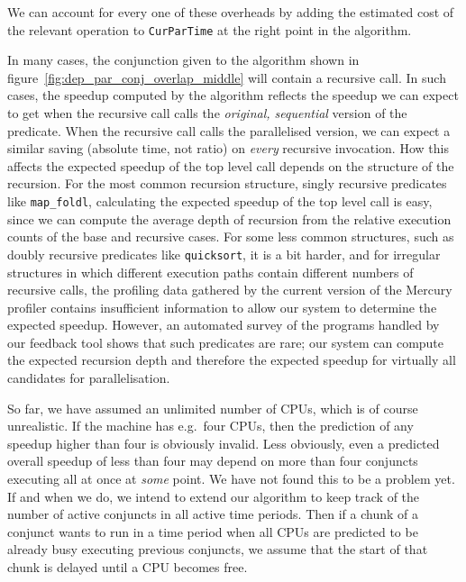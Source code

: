 \noindent
We can account for every one of these overheads
by adding the estimated cost of the relevant operation to \verb|CurParTime|
at the right point in the algorithm.

In many cases,
the conjunction given to the algorithm shown in figure~\ref{fig:dep_par_conj_overlap_middle}
will contain a recursive call.
In such cases, the speedup computed by the algorithm
reflects the speedup we can expect to get when the recursive call
calls the \emph{original, sequential} version of the predicate.
When the recursive call calls the parallelised version,
we can expect a similar saving (absolute time, not ratio)
on \emph{every} recursive invocation.
How this affects the expected speedup of the top level call
depends on the structure of the recursion.
For the most common recursion structure,
singly recursive predicates like \verb|map_foldl|,
calculating the expected speedup of the top level call is easy,
since we can compute the average depth of recursion
from the relative execution counts of the base and recursive cases.
For some less common structures,
such as doubly recursive predicates like \verb|quicksort|, it is a bit harder,
and for irregular structures in which different execution paths
contain different numbers of recursive calls,
the profiling data gathered by the current version of the Mercury profiler
contains insufficient information to allow our system to determine the
expected speedup.
However, an automated survey of the programs handled by our feedback tool
shows that such predicates are rare;
our system can compute
the expected recursion depth and therefore the expected speedup
for virtually all candidates for parallelisation.

So far, we have assumed an unlimited number of CPUs,
which is of course unrealistic.
If the machine has e.g.\ four CPUs,
then the prediction of any speedup higher than four is obviously invalid.
Less obviously,
even a predicted overall speedup of less than four may depend
on more than four conjuncts executing all at once at \emph{some} point.
We have not found this to be a problem yet.
If and when we do,
we intend to extend our algorithm to keep track
of the number of active conjuncts in all active time periods.
Then if a chunk of a conjunct wants to run in a time period
when all CPUs are predicted to be already busy executing previous conjuncts,
we assume that the start of that chunk is delayed until a CPU becomes free.

